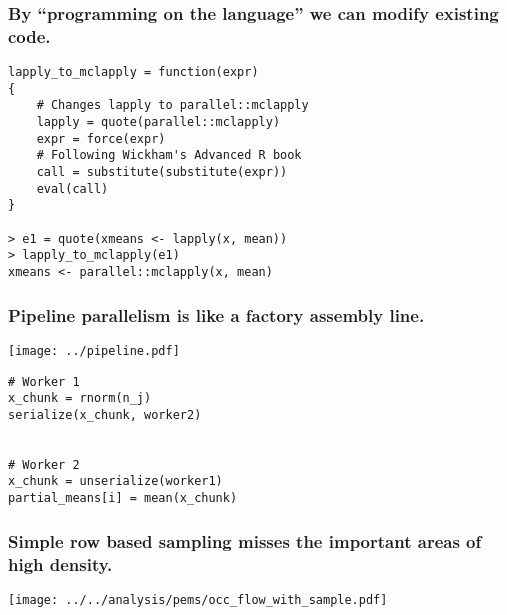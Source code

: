 \documentclass{beamer}
\begin{document}
\begin{frame}[fragile]

    \frametitle{By ``programming on the language'' we can modify existing
    code.}

\begin{verbatim}
lapply_to_mclapply = function(expr)
{
    # Changes lapply to parallel::mclapply
    lapply = quote(parallel::mclapply)
    expr = force(expr)
    # Following Wickham's Advanced R book
    call = substitute(substitute(expr))
    eval(call)
}

> e1 = quote(xmeans <- lapply(x, mean))
> lapply_to_mclapply(e1)
xmeans <- parallel::mclapply(x, mean)
\end{verbatim}

\end{frame}
\begin{frame}[fragile]

    \frametitle{Pipeline parallelism is like a factory assembly line.}

\centerline{\texttt{[image: ../pipeline.pdf]}}

\begin{verbatim}
# Worker 1
x_chunk = rnorm(n_j)
serialize(x_chunk, worker2)


# Worker 2
x_chunk = unserialize(worker1)
partial_means[i] = mean(x_chunk)
\end{verbatim}

\end{frame}
\begin{frame}

    \frametitle{Simple row based sampling misses the important areas of high
    density.}

    \centerline{\texttt{[image: ../../analysis/pems/occ\_flow\_with\_sample.pdf]}}



\end{frame}
\end{document}
